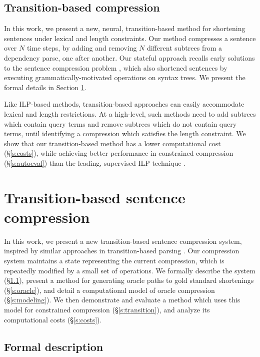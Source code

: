 \documentclass[11pt,a4paper]{article}
\begin{document}
\subsection{Transition-based compression}

In this work, we present a new, neural, transition-based method for shortening sentences under lexical and length constraints. Our method compresses a sentence over $N$ time steps, by adding and removing $N$ different subtrees from a dependency parse, one after another. Our stateful approach recalls early solutions to the sentence compression problem \cite{Jing2000SentenceRF,Knight2000StatisticsBasedS}, which also shortened sentences by executing grammatically-motivated operations on syntax trees. We present the formal details in Section \ref{s:system}. 

Like ILP-based methods, transition-based approaches can easily accommodate lexical and length restrictions. At a high-level, such methods need to add subtrees which contain query terms and remove subtrees which do not contain query terms, until identifying a compression which satisfies the length constraint. We show that our transition-based method has a lower computational cost (\S\ref{s:costs}), while achieving better performance in constrained compression (\S\ref{s:autoeval}) than the leading, supervised ILP technique \cite{filippova2013overcoming}.

\section{Transition-based sentence compression}\label{s:system}

In this work, we present a new transition-based sentence compression system, inspired by similar approaches in transition-based parsing \cite{nivre2003,D14-1082}. Our compression system maintains a state representing the current compression, which is repeatedly modified by a small set of operations. We formally describe the system (\S\ref{s:formal}), present a method for generating oracle paths to gold standard shortenings (\S\ref{s:oracle}), and detail a computational model of oracle compression (\S\ref{s:modeling}). We then demonstrate and evaluate a method which uses this model for constrained compression (\S\ref{s:transition}), and analyze its computational costs (\S\ref{s:costs}).

\subsection{Formal description}\label{s:formal}
\end{document}
